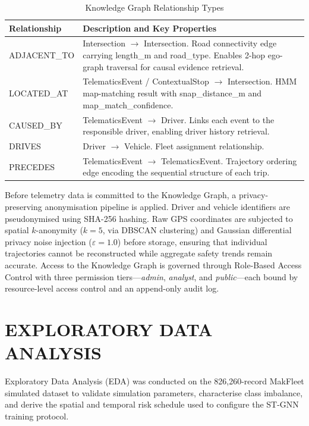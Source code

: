 \documentclass{ieeeaccess}
\begin{document}
\begin{table}[!t]
\caption{Knowledge Graph Relationship Types}
\label{tab:kg_relationships}
\centering
\begin{tabular}{|p{3.0cm}|p{4.8cm}|}
\hline
\textbf{Relationship} & \textbf{Description and Key Properties} \\
\hline
ADJACENT\_TO &
  Intersection $\rightarrow$ Intersection. Road connectivity edge
  carrying length\_m and road\_type. Enables 2-hop ego-graph
  traversal for causal evidence retrieval. \\
\hline
LOCATED\_AT &
  TelematicsEvent / ContextualStop $\rightarrow$ Intersection.
  HMM map-matching result with snap\_distance\_m and
  map\_match\_confidence. \\
\hline
CAUSED\_BY &
  TelematicsEvent $\rightarrow$ Driver. Links each event to the
  responsible driver, enabling driver history retrieval. \\
\hline
DRIVES &
  Driver $\rightarrow$ Vehicle. Fleet assignment relationship. \\
\hline
PRECEDES &
  TelematicsEvent $\rightarrow$ TelematicsEvent. Trajectory
  ordering edge encoding the sequential structure of each trip. \\
\hline
\end{tabular}
\end{table}

Before telemetry data is committed to the Knowledge Graph, a
privacy-preserving anonymisation pipeline is applied. Driver and
vehicle identifiers are pseudonymised using SHA-256 hashing. Raw GPS
coordinates are subjected to spatial $k$-anonymity ($k=5$, via DBSCAN
clustering) and Gaussian differential privacy noise injection
($\varepsilon=1.0$) before storage, ensuring that individual
trajectories cannot be reconstructed while aggregate safety trends
remain accurate. Access to the Knowledge Graph is governed through
Role-Based Access Control with three permission tiers---\emph{admin},
\emph{analyst}, and \emph{public}---each bound by resource-level
access control and an append-only audit log.


\section{EXPLORATORY DATA ANALYSIS}

Exploratory Data Analysis (EDA) was conducted on the 826,260-record
MakFleet simulated dataset to validate simulation parameters,
characterise class imbalance, and derive the spatial and temporal
risk schedule used to configure the ST-GNN training protocol.
\end{document}
